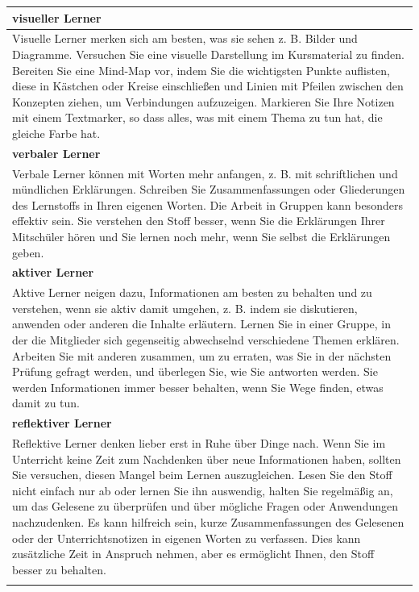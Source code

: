 \begin{longtable}{|m{15cm}|}
  \centering \arraybackslash \textbf{visueller Lerner}  \\ 
  \hline \hline 
  Visuelle Lerner merken sich am besten, was sie sehen z. B. Bilder und Diagramme.
  Versuchen Sie eine visuelle Darstellung im Kursmaterial zu finden.
  Bereiten Sie eine Mind-Map vor, indem Sie die wichtigsten Punkte auflisten,
  diese in Kästchen oder Kreise einschließen und Linien mit Pfeilen zwischen den 
  Konzepten ziehen, um Verbindungen aufzuzeigen. Markieren Sie Ihre Notizen mit
  einem Textmarker, so dass alles, was mit einem Thema zu tun hat, die gleiche Farbe hat.\\\hline 
  \hline   
  \rowcolor[HTML]{EFEFEF}                                         
  
  \centering \arraybackslash \textbf{verbaler Lerner}  \\ 
  \hline \hline 
  Verbale Lerner können mit Worten mehr anfangen, z. B. mit schriftlichen und
  mündlichen Erklärungen. Schreiben Sie Zusammenfassungen oder Gliederungen
  des Lernstoffs in Ihren eigenen Worten. Die Arbeit in Gruppen kann besonders
  effektiv sein. Sie verstehen den Stoff besser, wenn Sie die Erklärungen Ihrer
  Mitschüler hören und Sie lernen noch mehr, wenn Sie selbst die Erklärungen geben. \\ \hline
  \hline     
  \rowcolor[HTML]{EFEFEF}                                         

  \centering \arraybackslash \textbf{aktiver Lerner}  \\ 
  \hline \hline 
  Aktive Lerner neigen dazu, Informationen am besten zu behalten und zu verstehen,
  wenn sie aktiv damit umgehen, z. B. indem sie diskutieren, anwenden oder anderen
  die Inhalte erläutern. Lernen Sie in einer Gruppe, in der die Mitglieder sich gegenseitig
  abwechselnd verschiedene Themen erklären. Arbeiten Sie mit anderen zusammen,
  um zu erraten, was Sie in der nächsten Prüfung gefragt werden, und überlegen Sie,
  wie Sie antworten werden. Sie werden Informationen immer besser behalten, wenn
  Sie Wege finden, etwas damit zu tun. \\ \hline
  \hline    
  \rowcolor[HTML]{EFEFEF}                                         
 
  \centering \arraybackslash \textbf{reflektiver Lerner}  \\ 
  \hline \hline 
  Reflektive Lerner denken lieber erst in Ruhe über Dinge nach.
  Wenn Sie im Unterricht keine Zeit zum Nachdenken über neue Informationen haben, 
  sollten Sie versuchen, diesen Mangel beim Lernen auszugleichen. Lesen Sie den Stoff
  nicht einfach nur ab oder lernen Sie ihn auswendig, halten Sie regelmäßig an, um das
  Gelesene zu überprüfen und über mögliche Fragen oder Anwendungen nachzudenken.
  Es kann hilfreich sein, kurze Zusammenfassungen des Gelesenen oder der
  Unterrichtsnotizen in eigenen Worten zu verfassen. Dies kann zusätzliche Zeit in
  Anspruch nehmen, aber es ermöglicht Ihnen, den Stoff besser zu behalten. \\ \hline
  \hline     
  \rowcolor[HTML]{EFEFEF}                                         


\end{longtable}
